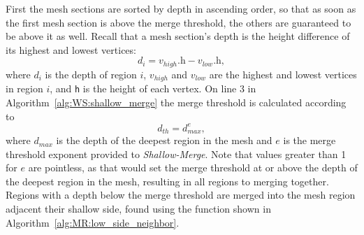 First the mesh sections are sorted by depth in ascending order, so that as soon as the first mesh section is above the merge threshold, the others are guaranteed to be above it as well.
Recall that a mesh section's depth is the height difference of its highest and lowest vertices:
\begin{equation*}
	d_i = v_{high}\text{.h} - v_{low}\text{.h},
\end{equation*}
where $d_i$ is the depth of region $i$, $v_{high}$ and $v_{low}$ are the highest and lowest vertices in region $i$, and \verb|h| is the height of each vertex.
On line 3 in Algorithm~\ref{alg:WS:shallow_merge} the merge threshold is calculated according to
\begin{equation}\label{eq:merge_threshold}
	d_{th} = d_{max}^{e},
\end{equation}
where $d_{max}$ is the depth of the deepest region in the mesh and $e$ is the merge threshold exponent provided to \textit{Shallow-Merge}.
Note that values greater than 1 for $e$ are pointless, as that would set the merge threshold at or above the depth of the deepest region in the mesh, resulting in all regions to merging together.
Regions with a depth below the merge threshold are merged into the mesh region adjacent their shallow side, found using the function shown in Algorithm~\ref{alg:MR:low_side_neighbor}.

